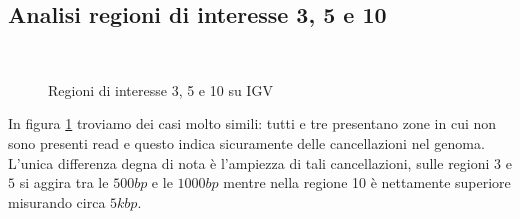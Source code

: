 \subsection{Analisi regioni di interesse 3, 5 e 10}
\begin{figure}[htbp]
\centering
{} \quad
{} \\
\caption{Regioni di interesse 3, 5 e 10 su IGV}
\label{fig:regioni 3, 5 e 10}
\end{figure}

In figura \ref{fig:regioni 3, 5 e 10} troviamo dei casi molto simili: tutti e tre presentano zone in cui non sono presenti read e questo indica sicuramente delle cancellazioni nel genoma.
L'unica differenza degna di nota è l'ampiezza di tali cancellazioni, sulle regioni $3$ e $5$ si aggira tra le $500bp$ e le $1000bp$ mentre nella regione 10 è nettamente superiore misurando circa $5kbp$.

